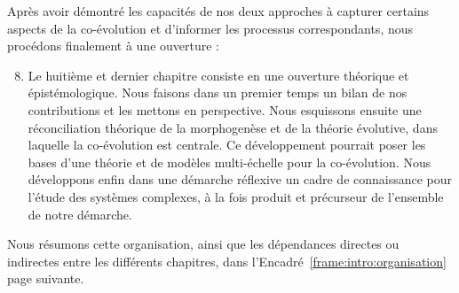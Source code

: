 {\begin{enumerate}
\end{enumerate}
Après avoir démontré les capacités de nos deux approches à capturer certains aspects de la co-évolution et d'informer les processus correspondants, nous procédons finalement à une ouverture :
\begin{enumerate}\setcounter{enumi}{7}
	\item Le huitième et dernier chapitre consiste en une ouverture théorique et épistémologique. Nous faisons dans un premier temps un bilan de nos contributions et les mettons en perspective. Nous esquissons ensuite une réconciliation théorique de la morphogenèse et de la théorie évolutive, dans laquelle la co-évolution est centrale. Ce développement pourrait poser les bases d'une théorie et de modèles multi-échelle pour la co-évolution. Nous développons enfin dans une démarche réflexive un cadre de connaissance pour l'étude des systèmes complexes, à la fois produit et précurseur de l'ensemble de notre démarche.
\end{enumerate}
}



Nous résumons cette organisation, ainsi que les dépendances directes ou indirectes entre les différents chapitres, dans l'Encadré~\ref{frame:intro:organisation} page suivante.


